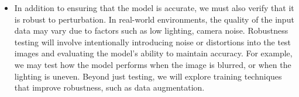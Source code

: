 \begin{itemize}
    \item In addition to ensuring that the model is accurate, we must also verify that it is robust to perturbation. 
    In real-world environments, the quality of the input data may vary due to factors such as low lighting, camera noise. 
    Robustness testing will involve intentionally introducing noise or distortions into the test images and evaluating the model’s ability to maintain accuracy. 
    For example, we may test how the model performs when the image is blurred, or when the lighting is uneven. 
    Beyond just testing, we will explore training techniques that improve robustness, such as data augmentation. 
\end{itemize}